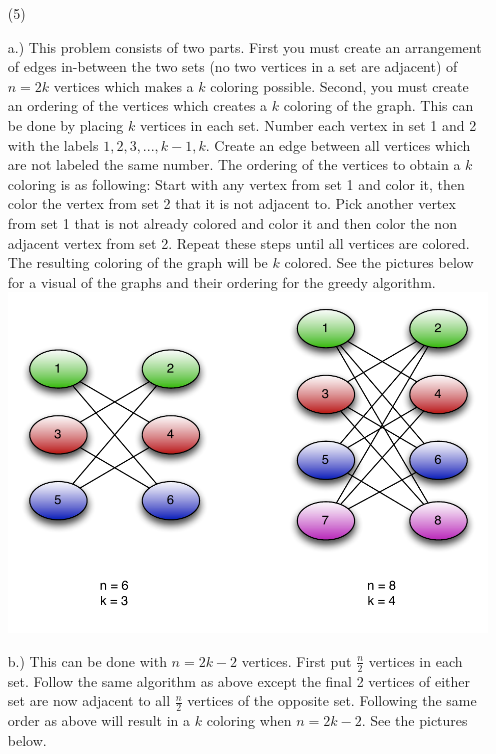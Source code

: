 \documentclass[11pt]{amsart}
\begin{document}
\begin{enumerate}
\item[(5)]  
{
a.) This problem consists of two parts. First you must create an arrangement of edges in-between the two sets (no two vertices in a set are adjacent) of $n=2k$ vertices  which makes a $k$ coloring possible. Second, you must create an ordering of the vertices which creates a $k$ coloring of the graph. This can be done by placing $k$ vertices in each set. Number each vertex in set 1 and 2 with the labels $1,2,3,...,k-1,k$. Create an edge between all vertices which are not labeled the same number. The ordering of the vertices to obtain a $k$ coloring is as following: Start with any vertex from set 1 and color it, then color the vertex from set 2 that it is not adjacent to.  Pick another vertex from set 1 that is not already colored and color it and then color the non adjacent vertex from set 2. Repeat these steps until all vertices are colored.  The resulting coloring of the graph will be $k$ colored. See the pictures below for a visual of the graphs and their ordering for the greedy algorithm. 
\includegraphics[scale=.5]{colorings}



b.) This can be done with $n=2k-2$ vertices.  First put $\frac{n}{2}$ vertices in each set. Follow the same algorithm as above except the final 2 vertices of either set are now adjacent to all $\frac{n}{2}$ vertices of the opposite set. Following the same order as above will result in a $k$ coloring when $n=2k-2$.  See the pictures below.

}
\end{enumerate}
\end{document}
